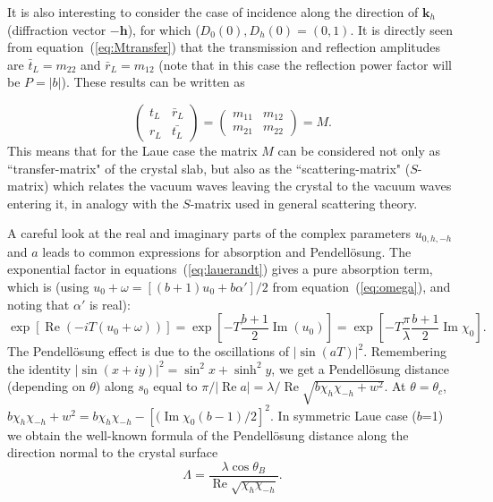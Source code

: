 \documentclass[preprint]{iucr}              %
\begin{document}
It is also interesting to consider the case of incidence along the direction of $\textbf{k}_h$ (diffraction vector $-\textbf{h}$), for which ($D_0(0), D_h(0)=(0,1)$. It is directly seen from equation~(\ref{eq:Mtransfer}) that the transmission and reflection amplitudes are $\bar{t}_L=m_{22}$ and $\bar{r}_L=m_{12}$ (note that in this case the reflection power factor will be $P=|b|$). These results can be written as

\begin{equation}\label{eq:MtransferLaue}
    \begin{pmatrix}
    t_L & \bar{r}_L\\
    r_L & \bar{t_L}
    \end{pmatrix}
    =
    \begin{pmatrix}
    m_{11} & m_{12}\\
    m_{21} & m_{22}
    \end{pmatrix}
    = M.
\end{equation}
This means that for the Laue case the matrix $M$ can be considered not only as ``transfer-matrix" of the crystal slab, but also as the ``scattering-matrix" ($S$-matrix) which relates the vacuum waves leaving the crystal to the vacuum waves entering it, in analogy with the $S$-matrix used in general scattering theory.  

A careful look at the real and imaginary parts of the complex parameters $u_{0,h,-h}$ and $a$ leads to common expressions for absorption and Pendell\"osung. 
The exponential factor in equations~(\ref{eq:lauerandt}) gives a pure absorption term, which is (using $u_0 +\omega=[(b+1)u_0+b\alpha']/2$ from equation~({\ref{eq:omega}}), 
and noting that $\alpha'$ is real):  
\begin{equation}
   \exp[\operatorname{Re}(-iT(u_0+\omega))] = 
    \exp[-T \frac{b+1}{2}\operatorname{Im}(u_0)] =  
    \exp[-T \frac{\pi}{\lambda}\frac{b+1}{2} \operatorname{Im} \chi_0].
\end{equation}
The Pendell\"osung effect is due to the oscillations of $|\sin(aT)|^2$. Remembering the identity $|\sin(x+iy)|^2=\sin^2x + \sinh^2 y$, we get a Pendell\"osung distance (depending on $\theta$) along $s_0$ equal to  
$\pi / |\operatorname{Re} a|=\lambda / \operatorname{Re}\sqrt{b\chi_h\chi_{-h} + w^2}$.
At $\theta=\theta_c$, $b \chi_h \chi_{-h}+w^2=b \chi_h \chi_{-h} - [(\operatorname{Im}\chi_0(b-1)/2]^2$. In symmetric Laue case ($b$=1) we obtain the well-known formula of the Pendell\"osung distance along the direction normal to the crystal surface
\begin{equation}\label{eq:Pendellosung}
    \Lambda =\frac{\lambda \cos\theta_B}{\operatorname{Re}\sqrt{\chi_h\chi_{-h}}} .
\end{equation}
\end{document}
